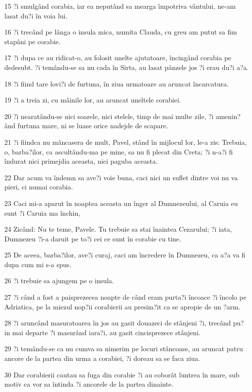 \par 15 ?i smulgând corabia, iar ea neputând sa mearga împotriva vântului, ne-am lasat du?i în voia lui.
\par 16 ?i trecând pe lânga o insula mica, numita Clauda, cu greu am putut sa fim stapâni pe corabie.
\par 17 ?i dupa ce au ridicat-o, au folosit unelte ajutatoare, încingând corabia pe dedesubt. ?i temându-se sa nu cada în Sirta, au lasat pânzele jos ?i erau du?i a?a.
\par 18 ?i fiind tare lovi?i de furtuna, în ziua urmatoare au aruncat încarcatura.
\par 19 ?i a treia zi, cu mâinile lor, au aruncat uneltele corabiei.
\par 20 ?i nearatându-se nici soarele, nici stelele, timp de mai multe zile, ?i amenin?ând furtuna mare, ni se luase orice nadejde de scapare.
\par 21 ?i fiindca nu mâncasera de mult, Pavel, stând în mijlocul lor, le-a zis: Trebuia, o, barba?ilor, ca ascultându-ma pe mine, sa nu fi plecat din Creta; ?i n-a?i fi îndurat nici primejdia aceasta, nici paguba aceasta.
\par 22 Dar acum va îndemn sa ave?i voie buna, caci nici un suflet dintre voi nu va pieri, ci numai corabia.
\par 23 Caci mi-a aparut în noaptea aceasta un înger al Dumnezeului, al Caruia eu sunt ?i Caruia ma închin,
\par 24 Zicând: Nu te teme, Pavele. Tu trebuie sa stai înaintea Cezarului; ?i iata, Dumnezeu ?i-a daruit pe to?i cei ce sunt în corabie cu tine.
\par 25 De aceea, barba?ilor, ave?i curaj, caci am încredere în Dumnezeu, ca a?a va fi dupa cum mi s-a spus.
\par 26 ?i trebuie sa ajungem pe o insula.
\par 27 ?i când a fost a paisprezecea noapte de când eram purta?i încoace ?i încolo pe Adriatica, pe la miezul nop?ii corabierii au presim?it ca se apropie de un ?arm.
\par 28 ?i aruncând masuratoarea în jos au gasit douazeci de stânjeni ?i, trecând pu?in mai departe ?i masurând iara?i, au gasit cincisprezece stânjeni.
\par 29 ?i temându-se ca nu cumva sa nimerim pe locuri stâncoase, au aruncat patru ancore de la partea din urma a corabiei, ?i doreau sa se faca ziua.
\par 30 Dar corabierii cautau sa fuga din corabie ?i au coborât luntrea în mare, sub motiv ca vor sa întinda ?i ancorele de la partea dinainte.
